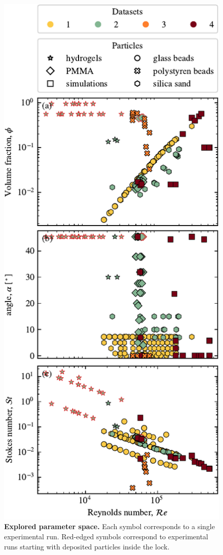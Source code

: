 \documentclass[12pt]{article}
\begin{document}
\begin{figure}
	\centering
	\includegraphics{figure2.pdf}
	\caption{\textbf{Explored parameter space.} Each symbol corresponds to a single experimental run. Red-edged symbols correspond to experimental runs starting with deposited particles inside the lock.}
	\label{fig:fig2}
\end{figure}
\end{document}

